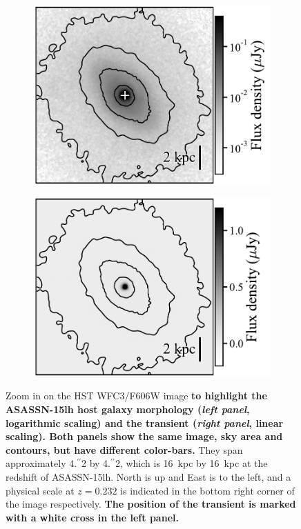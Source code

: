 \documentclass[traditabstract]{aa}
\newcommand{\farc}{\hbox{$.\!\!^{\prime\prime}$}}
\begin{document}
\begin{figure}
\begin{subfigure}{.2425\textwidth}
  \includegraphics[width=0.999\linewidth]{fig/WFC3_ASASSN-15lh_wfc2.pdf}
\end{subfigure}
\begin{subfigure}{.2425\textwidth}
  \includegraphics[width=0.999\linewidth]{fig/WFC3_ASASSN-15lh_wfc3.pdf}
\end{subfigure}
\caption{Zoom in on the HST WFC3/F606W image \textbf{to highlight the ASASSN-15lh host galaxy morphology (\textit{left panel}, logarithmic scaling) and the transient (\textit{right panel}, linear scaling). Both panels show the same image, sky area and contours, but have different color-bars.} They span approximately 4\farc{2} by 4\farc{2}, which is 16~kpc by 16~kpc at the redshift of ASASSN-15lh. North is up and East is to the left, and a physical scale at $z=0.232$ is indicated in the bottom right corner of the image respectively. \textbf{The position of the transient is marked with a white cross in the left panel.}}
\label{fig:fczoom}
\end{figure}
\end{document}
